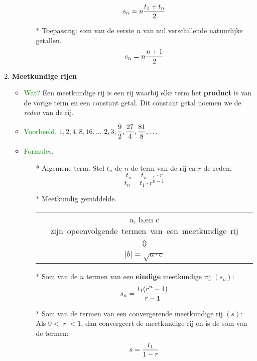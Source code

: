 \begin{enumerate}
\begin{itemize}
\begin{itemize}
			\[s_n=n\displaystyle\frac{\displaystyle t_1+t_n}{\displaystyle 2}\]
			\item[*] Toepassing: som van de eerste $n$ van nul verschillende natuurlijke 			getallen.
			\[ s_n = n \displaystyle \frac{\displaystyle n+1}{\displaystyle 2}\]
			\end{itemize}
		\end{itemize}%
		\item \hypertarget{meetkundige_rijen}{{\bf Meetkundige rijen}}\label{meetkundige_rijen}
		\begin{itemize}%
		\item \textcolor{green}{Wat?}\newline
		Een meetkundige rij is een rij waarbij elke term het {\bf product} is van de vorige 		term en een constant getal. Dit constant getal noemen we de {\it reden} van de rij.
		\item \textcolor{green}{Voorbeeld.}\newline
		$1, 2, 4, 8, 16, \ldots$ \newline
		$2, 3, \displaystyle\frac{\displaystyle 9}{\displaystyle 2}, \displaystyle\frac{\displaystyle 27}{\displaystyle 4},\displaystyle\frac{\displaystyle 81}{\displaystyle 8},\ldots$
		\item \textcolor{green}{Formules.}\newline
		\begin{itemize}
		\item[*] Algemene term.\newline
		Stel $t_n$ de $n$-de term van de rij en $r$ de reden.
		\[t_n = t_{n-1}\cdot r\]
		\[t_n = t_1 \cdot r^{n-1}\]
		\item[*] Meetkundig gemiddelde.\newline
		\begin{tabular}{c}
		 a, b,\:\mbox{en}\: c \:\mbox {zijn opeenvolgende termen van een meetkundige 		rij}\\
		$\Updownarrow$ \\
		$|b| = \sqrt{a \cdot c}$
		\end{tabular}
		\item[*] \hypertarget{som_meetkundige_rij}{Som van de $n$ termen van een {\bf eindige} meetkundige rij $(s_n)$:}
		\label{som meetkundige rij}\newline
		\[s_n=\displaystyle\frac{\displaystyle t_1(r^n-1)}{\displaystyle r-1}\]
		\item[*] Som van de termen van een convergerende meetkundige rij $(s)$:\newline
		Als $0 < |r| < 1$, dan convergeert de meetkundige rij en is de som van de termen:
		\[s = \displaystyle\frac{\displaystyle t_1}{\displaystyle 1-r}\]		
		\end{itemize}
		\end{itemize}%
	\end{enumerate}%

